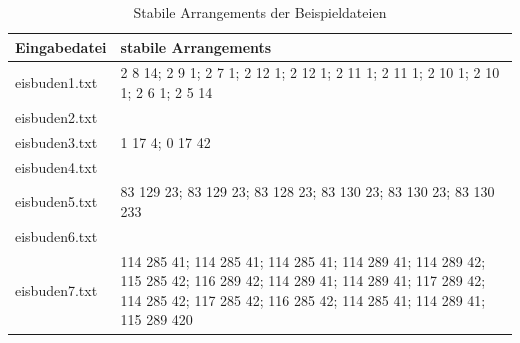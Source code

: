 \documentclass[a4paper,10pt,ngerman,captions=figureheading]{scrartcl}
\begin{document}
\begin{table}[h!t]
    \begin{center}
        \begin{tabularx}{\linewidth}{l|X}
            \textbf{Eingabedatei} & \textbf{stabile Arrangements}                                                                                                                                                                   \\
            \midrule
            eisbuden1.txt         & 2 8 14; 2 9 1; 2 7 1; 2 12 1; 2 12 1; 2 11 1; 2 11 1; 2 10 1; 2 10 1; 2 6 1; 2 5 14                                                                                                             \\
            \midrule
            eisbuden2.txt         &                                                                                                                                                                                                 \\
            \midrule
            eisbuden3.txt         & 1 17 4; 0 17 42                                                                                                                                                                                 \\
            \midrule
            eisbuden4.txt         &                                                                                                                                                                                                 \\
            \midrule
            eisbuden5.txt         & 83 129 23; 83 129 23; 83 128 23; 83 130 23; 83 130 23; 83 130 233                                                                                                                               \\
            \midrule
            eisbuden6.txt         &                                                                                                                                                                                                 \\
            \midrule
            eisbuden7.txt         & 114 285 41; 114 285 41; 114 285 41; 114 289 41; 114 289 42; 115 285 42; 116 289 42; 114 289 41; 114 289 41; 117 289 42; 114 285 42; 117 285 42; 116 285 42; 114 285 41; 114 289 41; 115 289 420 \\
        \end{tabularx}
        \caption{Stabile Arrangements der Beispieldateien}
        \label{tab:BWINF_Beispiele}
    \end{center}
\end{table}
\end{document}
